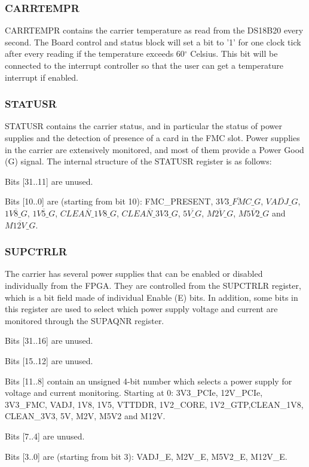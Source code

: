 \documentclass{article}
\newenvironment{packed_item}{
\begin{itemize}
  \setlength{\itemsep}{1pt}
  \setlength{\parskip}{0pt}
  \setlength{\parsep}{0pt}
}{\end{itemize}}
\begin{document}
\subsubsection{CARRTEMPR}
CARRTEMPR contains the carrier temperature as read from the DS18B20 every second. The Board control and status block will set a bit to '1' for one clock tick after every reading if the temperature exceeds 60$^\circ$ Celsius. This bit will be connected to the interrupt controller so that the user can get a temperature interrupt if enabled. 

\subsubsection{STATUSR}
STATUSR contains the carrier status, and in particular the status of power supplies and the detection of presence of a card in the FMC slot. Power supplies in the carrier are extensively monitored, and most of them provide a Power Good (G) signal. The internal structure of the STATUSR register is as follows:
\begin{packed_item}
\item Bits [31..11] are unused.
\item Bits [10..0] are (starting from bit 10): FMC\_PRESENT, $\overline{3V3\_FMC\_G}$,  $\overline{VADJ\_G}$, $\overline{1V8\_G}$,  $\overline{1V5\_G}$,  $\overline{CLEAN\_1V8\_G}$, $\overline{CLEAN\_3V3\_G}$, $\overline{5V\_G}$, \linebreak$\overline{M2V\_G}$, $\overline{M5V2\_G}$ and $\overline{M12V\_G}$.
\end{packed_item}

\subsubsection{SUPCTRLR}
The carrier has several power supplies that can be enabled or disabled individually from the FPGA. They are controlled from the SUPCTRLR register, which is a bit field made of individual Enable (E) bits. In addition, some bits in this register are used to select which power supply voltage and current are monitored through the SUPAQNR register.
\begin{packed_item}
\item Bits [31..16] are unused.
\item Bits [15..12] are unused.
\item Bits [11..8] contain an unsigned 4-bit number which selects a power supply for voltage and current monitoring. Starting at 0: 3V3\_PCIe, 12V\_PCIe, 3V3\_FMC, VADJ, 1V8, 1V5, VTTDDR, 1V2\_CORE, 1V2\_GTP,\linebreak CLEAN\_1V8, CLEAN\_3V3, 5V, M2V, M5V2 and M12V.
\item Bits [7..4] are unused.
\item Bits [3..0] are (starting from bit 3): VADJ\_E, M2V\_E, M5V2\_E, M12V\_E.
\end{packed_item}
\end{document}
